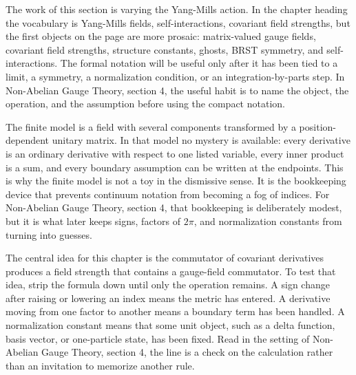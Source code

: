 











The work of this section is varying the Yang-Mills action.  In the chapter heading the vocabulary is Yang-Mills fields, self-interactions, covariant field strengths, but the first objects on the page are more prosaic: matrix-valued gauge fields, covariant field strengths, structure constants, ghosts, BRST symmetry, and self-interactions.  The formal notation will be useful only after it has been tied to a limit, a symmetry, a normalization condition, or an integration-by-parts step.  In Non-Abelian Gauge Theory, section 4, the useful habit is to name the object, the operation, and the assumption before using the compact notation.

The finite model is a field with several components transformed by a position-dependent unitary matrix.  In that model no mystery is available: every derivative is an ordinary derivative with respect to one listed variable, every inner product is a sum, and every boundary assumption can be written at the endpoints.  This is why the finite model is not a toy in the dismissive sense.  It is the bookkeeping device that prevents continuum notation from becoming a fog of indices.  For Non-Abelian Gauge Theory, section 4, that bookkeeping is deliberately modest, but it is what later keeps signs, factors of \(2\pi\), and normalization constants from turning into guesses.

The central idea for this chapter is the commutator of covariant derivatives produces a field strength that contains a gauge-field commutator.  To test that idea, strip the formula down until only the operation remains.  A sign change after raising or lowering an index means the metric has entered.  A derivative moving from one factor to another means a boundary term has been handled.  A normalization constant means that some unit object, such as a delta function, basis vector, or one-particle state, has been fixed.  Read in the setting of Non-Abelian Gauge Theory, section 4, the line is a check on the calculation rather than an invitation to memorize another rule.

